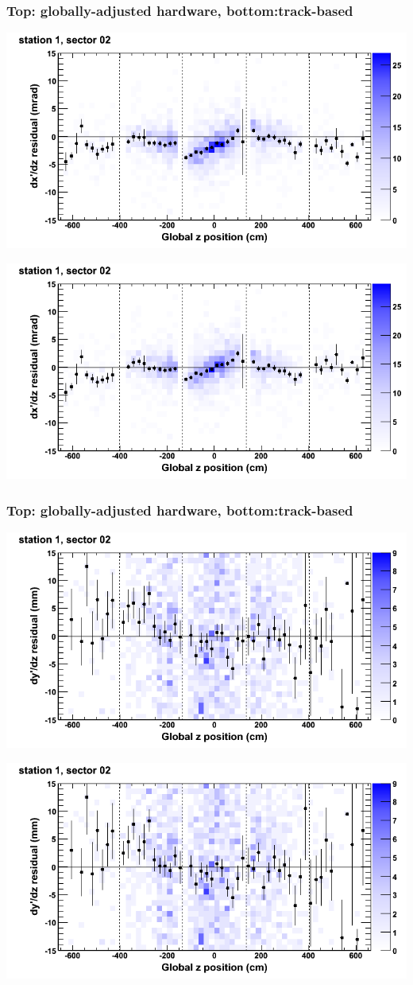 \documentclass[compress]{beamer}
\begin{document}
\begin{frame}
\frametitle{Top: globally-adjusted hardware, bottom:track-based}
\includegraphics[width=0.7\linewidth]{NOV4_mapplots_HW/DTvsz_st1sec02_dxdz.png}

\includegraphics[width=0.7\linewidth]{NOV4_mapplots/DTvsz_st1sec02_dxdz.png}
\end{frame}

\begin{frame}
\frametitle{Top: globally-adjusted hardware, bottom:track-based}
\includegraphics[width=0.7\linewidth]{NOV4_mapplots_HW/DTvsz_st1sec02_dydz.png}

\includegraphics[width=0.7\linewidth]{NOV4_mapplots/DTvsz_st1sec02_dydz.png}
\end{frame}
\end{document}
